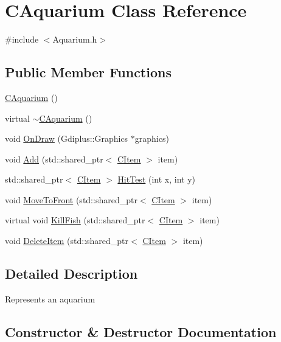 \hypertarget{class_c_aquarium}{}\section{C\+Aquarium Class Reference}
\label{class_c_aquarium}


{\ttfamily \#include $<$Aquarium.\+h$>$}

\subsection*{Public Member Functions}
\begin{DoxyCompactItemize}
\item 
\hyperlink{class_c_aquarium_ab6ba8b1abd87437ff66748e82173a5a8}{C\+Aquarium} ()
\item 
virtual \hyperlink{class_c_aquarium_ab1baf78dc047af2b8cab8982e1446875}{$\sim$\+C\+Aquarium} ()
\item 
void \hyperlink{class_c_aquarium_a20b4899158d1ba4bc41217630d47e180}{On\+Draw} (Gdiplus\+::\+Graphics $\ast$graphics)
\item 
void \hyperlink{class_c_aquarium_a85063d05c147cf80f54182016fe12d64}{Add} (std\+::shared\+\_\+ptr$<$ \hyperlink{class_c_item}{C\+Item} $>$ item)
\item 
std\+::shared\+\_\+ptr$<$ \hyperlink{class_c_item}{C\+Item} $>$ \hyperlink{class_c_aquarium_a7129486467e76938fbc049723f9187f3}{Hit\+Test} (int x, int y)
\item 
void \hyperlink{class_c_aquarium_a44230dbff0c91121b55baae49e6fbb5e}{Move\+To\+Front} (std\+::shared\+\_\+ptr$<$ \hyperlink{class_c_item}{C\+Item} $>$ item)
\item 
virtual void \hyperlink{class_c_aquarium_ae159ee63d91f3a4b37644640fa67fdd8}{Kill\+Fish} (std\+::shared\+\_\+ptr$<$ \hyperlink{class_c_item}{C\+Item} $>$ item)
\item 
void \hyperlink{class_c_aquarium_a600f0ffe730776b9d5539511a4b191b9}{Delete\+Item} (std\+::shared\+\_\+ptr$<$ \hyperlink{class_c_item}{C\+Item} $>$ item)
\end{DoxyCompactItemize}


\subsection{Detailed Description}
Represents an aquarium 

\subsection{Constructor \& Destructor Documentation}
\mbox{\label{class_c_aquarium_ab6ba8b1abd87437ff66748e82173a5a8}} 
